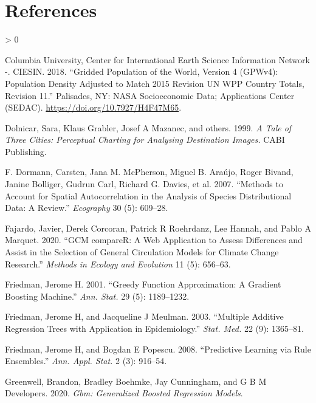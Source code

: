 \documentclass[
]{article}
\newlength{\cslhangindent}
\newenvironment{CSLReferences}[2] %
 {%
  \setlength{\parindent}{0pt}
  \ifodd #1 \everypar{\setlength{\hangindent}{\cslhangindent}}\ignorespaces\fi
  \ifnum #2 > 0
  \setlength{\parskip}{#2\baselineskip}
  \fi
 }%
 {}
\begin{document}
\hypertarget{references}{%
\section*{References}\label{references}}

\hypertarget{refs}{}
\begin{CSLReferences}{1}{0}
\leavevmode\hypertarget{ref-ColumbiaUniversity2018}{}%
Columbia University, Center for International Earth Science Information Network -. CIESIN. 2018. {``Gridded Population of the World, Version 4 (GPWv4): Population Density Adjusted to Match 2015 Revision UN WPP Country Totals, Revision 11.''} Palisades, NY: NASA Socioeconomic Data; Applications Center (SEDAC). \url{https://doi.org/10.7927/H4F47M65}.

\leavevmode\hypertarget{ref-dolnicar1999tale}{}%
Dolnicar, Sara, Klaus Grabler, Josef A Mazanec, and others. 1999. \emph{A Tale of Three Cities: Perceptual Charting for Analysing Destination Images.} CABI Publishing.

\leavevmode\hypertarget{ref-Dormann2007methods}{}%
F. Dormann, Carsten, Jana M. McPherson, Miguel B. Araújo, Roger Bivand, Janine Bolliger, Gudrun Carl, Richard G. Davies, et al. 2007. {``Methods to Account for Spatial Autocorrelation in the Analysis of Species Distributional Data: A Review.''} \emph{Ecography} 30 (5): 609--28.

\leavevmode\hypertarget{ref-fajardo2020gcm}{}%
Fajardo, Javier, Derek Corcoran, Patrick R Roehrdanz, Lee Hannah, and Pablo A Marquet. 2020. {``GCM compareR: A Web Application to Assess Differences and Assist in the Selection of General Circulation Models for Climate Change Research.''} \emph{Methods in Ecology and Evolution} 11 (5): 656--63.

\leavevmode\hypertarget{ref-Friedman2001-vj}{}%
Friedman, Jerome H. 2001. {``Greedy Function Approximation: A Gradient Boosting Machine.''} \emph{Ann. Stat.} 29 (5): 1189--1232.

\leavevmode\hypertarget{ref-Friedman2003-tl}{}%
Friedman, Jerome H, and Jacqueline J Meulman. 2003. {``Multiple Additive Regression Trees with Application in Epidemiology.''} \emph{Stat. Med.} 22 (9): 1365--81.

\leavevmode\hypertarget{ref-Friedman2008-ep}{}%
Friedman, Jerome H, and Bogdan E Popescu. 2008. {``Predictive Learning via Rule Ensembles.''} \emph{Ann. Appl. Stat.} 2 (3): 916--54.

\leavevmode\hypertarget{ref-Greenwell2020-lk}{}%
Greenwell, Brandon, Bradley Boehmke, Jay Cunningham, and G B M Developers. 2020. \emph{Gbm: Generalized Boosted Regression Models}.


\end{CSLReferences}
\end{document}
